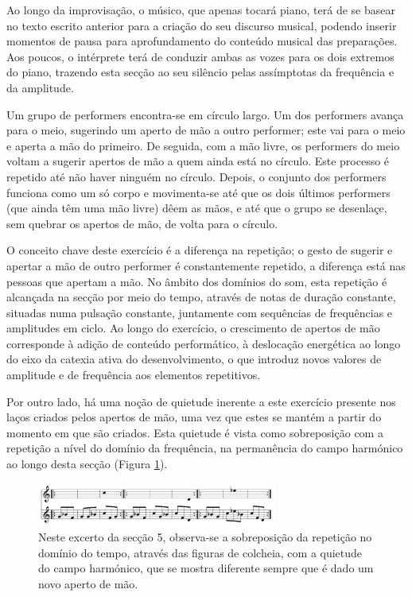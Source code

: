 \documentclass[../main.tex]{subfiles}
\begin{document}
Ao longo da improvisação, o músico, que apenas tocará piano, terá de se basear no texto escrito anterior para a criação do seu discurso musical, podendo inserir momentos de pausa para aprofundamento do conteúdo musical das preparações. Aos poucos, o intérprete terá de conduzir ambas as vozes para os dois extremos do piano, trazendo esta secção ao seu silêncio pelas assímptotas da frequência e da amplitude.

\begin{performex}
    Um grupo de performers encontra-se em círculo largo. Um dos performers avança para o meio, sugerindo um aperto de mão a outro performer; este vai para o meio e aperta a mão do primeiro. De seguida, com a mão livre, os performers do meio voltam a sugerir apertos de mão a quem ainda está no círculo. Este processo é repetido até não haver ninguém no círculo. Depois, o conjunto dos performers funciona como um só corpo e movimenta-se até que os dois últimos performers (que ainda têm uma mão livre) dêem as mãos, e até que o grupo se desenlaçe, sem quebrar os apertos de mão, de volta para o círculo.
\end{performex}

O conceito chave deste exercício é a diferença na repetição; o gesto de sugerir e apertar a mão de outro performer é constantemente repetido, a diferença está nas pessoas que apertam a mão. No âmbito dos domínios do som, esta repetição é alcançada na secção por meio do tempo, através de notas de duração constante, situadas numa pulsação constante, juntamente com sequências de frequências e amplitudes em ciclo. Ao longo do exercício, o crescimento de apertos de mão corresponde à adição de conteúdo performático, à deslocação energética ao longo do eixo da catexia ativa do desenvolvimento, o que introduz novos valores de amplitude e de frequência aos elementos repetitivos.

Por outro lado, há uma noção de quietude inerente a este exercício presente nos laços criados pelos apertos de mão, uma vez que estes se mantém a partir do momento em que são criados. Esta quietude é vista como sobreposição com a repetição a nível do domínio da frequência, na permanência do campo harmónico ao longo desta secção (Figura \ref{fig:obra5}).

\begin{figure}[h]
    \centering
    \captionsetup{width=0.8\textwidth}
    \includegraphics[width=0.7\textwidth]{images/obra5.png}
    \caption{Neste excerto da secção 5, observa-se a sobreposição da repetição no domínio do tempo, através das figuras de colcheia, com a quietude do campo harmónico, que se mostra diferente sempre que é dado um novo aperto de mão.}
    \label{fig:obra5}
\end{figure}
\end{document}
